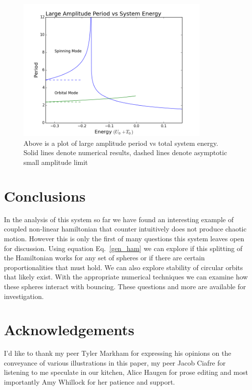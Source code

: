 \documentclass[prbg,preprint]{revtex4-1}
\begin{document}
\begin{figure}[h]
	\centering
	\includegraphics[width=0.85\textwidth]{./images/plot.png}
	\caption{Above is a plot of large amplitude period vs total system energy. Solid lines denote numerical results, dashed lines denote asymptotic small amplitude limit}
\end{figure}

\section{Conclusions}

In the analysis of this system so far we have found an interesting example of coupled non-linear hamiltonian that counter intuitively does not produce chaotic motion. However this is only the first of many questions this system leaves open for discussion. Using equation Eq.~\ref{gen_ham} we can explore if this splitting of the Hamiltonian works for any set of spheres or if there are certain proportionalities that must hold. We can also explore stability of circular orbits that likely exist. With the appropriate numerical techniques we can examine how these spheres interact with bouncing. These questions and more are available for investigation.

\section{Acknowledgements}

I'd like to thank my peer Tyler Markham for expressing his opinions on the conveyance of various illustrations in this paper, my peer Jacob Ciafre for listening to me speculate in our kitchen, Alice Haugen for prose editing and most importantly Amy Whillock for her patience and support.




\end{document}
